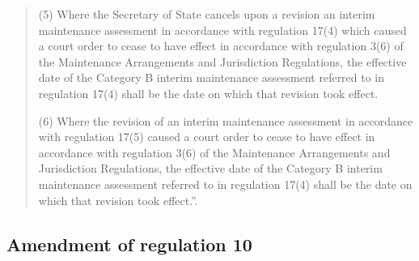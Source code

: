 \documentclass[12pt,a4paper]{article}
\begin{document}
\begin{quotation}
(5) Where the Secretary of State cancels upon a revision an interim maintenance assessment in accordance with regulation 17(4) which caused a court order to cease to have effect in accordance with regulation 3(6) of the Maintenance Arrangements and Jurisdiction Regulations, the effective date of the Category B interim maintenance assessment referred to in regulation 17(4) shall be the date on which that revision took effect.

(6) Where the revision of an interim maintenance assessment in accordance with regulation 17(5) caused a court order to cease to have effect in accordance with regulation 3(6) of the Maintenance Arrangements and Jurisdiction Regulations, the effective date of the Category B interim maintenance assessment referred to in regulation 17(4) shall be the date on which that revision took effect.”.
\end{quotation}

\subsection[11. Amendment of regulation 10]{Amendment of regulation 10}
\end{document}
